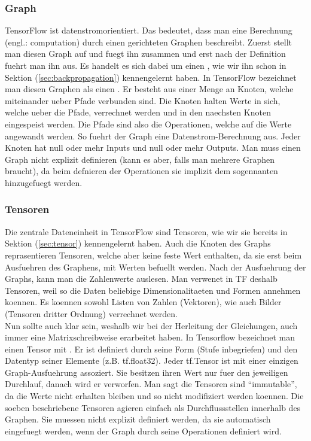 \subsubsection{Graph}
TensorFlow ist datenstromorientiert. Das bedeutet, dass man eine Berechnung
(engl.: computation) durch einen gerichteten Graphen beschreibt. Zuerst stellt
man diesen Graph auf und fuegt ihn zusammen und erst nach der Definition fuehrt man
ihn aus.
Es handelt es sich dabei um einen , wie wir ihn schon in Sektion (\ref{sec:backpropagation}) kennengelernt
haben. In TensorFlow bezeichnet man diesen Graphen als einen .
\para{}
Er besteht aus einer Menge an Knoten, welche miteinander ueber Pfade
verbunden sind. Die Knoten halten Werte in sich, welche ueber die Pfade,
verrechnet werden und in den naechsten Knoten eingespeist werden. Die Pfade sind also die Operationen, welche auf die Werte
angewandt werden. So fuehrt der Graph eine Datenstrom-Berechnung aus.
Jeder Knoten hat null oder mehr Inputs und null oder mehr Outputs.
\para{}
Man muss einen Graph nicht explizit definieren (kann es aber, falls man mehrere
Graphen braucht), da beim defnieren der Operationen sie implizit dem
sogennanten  hinzugefuegt werden.

\subsubsection{Tensoren}
Die zentrale Dateneinheit in TensorFlow sind Tensoren, wie wir sie bereits in
Sektion (\ref{sec:tensor}) kennengelernt haben.
Auch die Knoten des Graphs reprasentieren Tensoren, welche aber keine feste Wert
enthalten, da sie erst beim Ausfuehren des Graphens, mit Werten befuellt werden.
Nach der Ausfuehrung der Graphs, kann man die Zahlenwerte auslesen.
\para{}
Man verwenet in TF deshalb Tensoren, weil so die Daten beliebige Dimensionalitaeten
und Formen annehmen koennen. Es koennen sowohl Listen von Zahlen (Vektoren),
wie auch Bilder (Tensoren dritter Ordnung) verrechnet werden. \\
Nun sollte auch klar sein, weshalb wir bei der Herleitung der Gleichungen, auch
immer eine Matrixschreibweise erarbeitet haben.
\para{}
In Tensorflow bezeichnet man einen Tensor mit .
Er ist definiert durch seine Form (Stufe inbegriefen) und den Datentyp seiner
Elemente (z.B. tf.float32).
\para{}
Jeder tf.Tensor ist mit einer einzigen Graph-Ausfuehrung assoziert. Sie
besitzen ihren Wert nur fuer den jeweiligen Durchlauf, danach wird er verworfen.
Man sagt die Tensoren sind ``immutable'', da die Werte nicht erhalten bleiben
und so nicht modifiziert werden koennen.
\para{}
Die soeben beschriebene Tensoren agieren einfach als Durchflussstellen innerhalb
des Graphen. Sie muessen nicht explizit definiert werden, da sie automatisch
eingefuegt werden, wenn der Graph durch seine Operationen definiert wird.
\para{}

